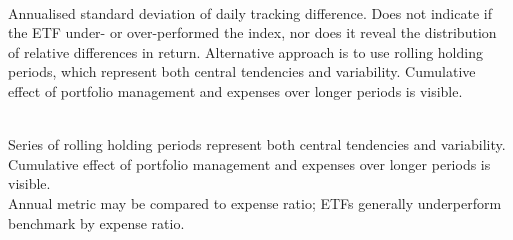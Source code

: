 \begin{definition} \\
Annualised standard deviation of daily tracking difference. Does not indicate if the ETF under- or over-performed the index, nor does it reveal the distribution of relative differences in return.
Alternative approach is to use rolling holding periods, which represent both central tendencies and variability. Cumulative effect of portfolio management and expenses over longer periods is visible. 
\end{definition}

\begin{definition} \\
Series of rolling holding periods represent both central tendencies and variability.\\
Cumulative effect of portfolio management and expenses over longer periods is visible.\\
Annual metric may be compared to expense ratio; ETFs generally underperform benchmark by expense ratio.
\end{definition}

